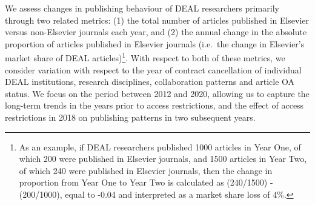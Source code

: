 \documentclass[
]{article}
\begin{document}
We assess changes in publishing behaviour of DEAL researchers primarily through two related metrics: (1) the total number of articles published in Elsevier versus non-Elsevier journals each year, and (2) the annual change in the absolute proportion of articles published in Elsevier journals (i.e.~the change in Elsevier's market share of DEAL articles)\footnote{As an example, if DEAL researchers published 1000 articles in Year One, of which 200 were published in Elsevier journals, and 1500 articles in Year Two, of which 240 were published in Elsevier journals, then the change in proportion from Year One to Year Two is calculated as (240/1500) - (200/1000), equal to -0.04 and interpreted as a market share loss of 4\%.}. With respect to both of these metrics, we consider variation with respect to the year of contract cancellation of individual DEAL institutions, research disciplines, collaboration patterns and article OA status. We focus on the period between 2012 and 2020, allowing us to capture the long-term trends in the years prior to access restrictions, and the effect of access restrictions in 2018 on publishing patterns in two subsequent years.
\end{document}
